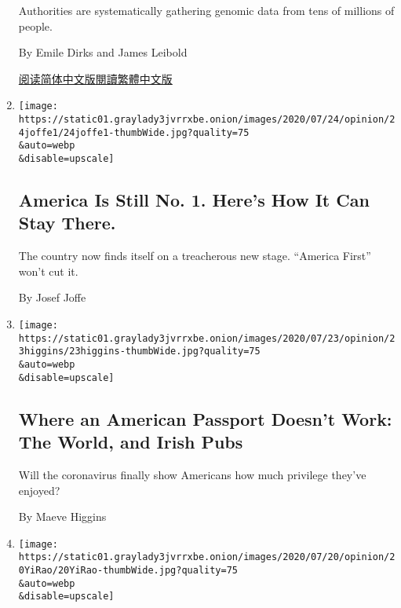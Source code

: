 \begin{enumerate}
  Authorities are systematically gathering genomic data from tens of
  millions of people.

  By Emile Dirks and James Leibold

  \href{https://cn.nytimes3xbfgragh.onion/opinion/20200728/china-dna-police/}{阅读简体中文版}\href{https://cn.nytimes3xbfgragh.onion/opinion/20200728/china-dna-police/zh-hant/}{閱讀繁體中文版}
\item
  \href{/2020/07/24/opinion/united-states-europe-china.html}{}

  \texttt{[image: https://static01.graylady3jvrrxbe.onion/images/2020/07/24/opinion/24joffe1/24joffe1-thumbWide.jpg?quality=75\\\&auto=webp\\\&disable=upscale]}

  \hypertarget{america-is-still-no-1-heres-how-it-can-stay-there}{%
  \subsection{America Is Still No. 1. Here's How It Can Stay
  There.}\label{america-is-still-no-1-heres-how-it-can-stay-there}}

  The country now finds itself on a treacherous new stage. ``America
  First'' won't cut it.

  By Josef Joffe
\item
  \href{/2020/07/23/opinion/passport-coronavirus-travel.html}{}

  \texttt{[image: https://static01.graylady3jvrrxbe.onion/images/2020/07/23/opinion/23higgins/23higgins-thumbWide.jpg?quality=75\\\&auto=webp\\\&disable=upscale]}

  \hypertarget{where-an-american-passport-doesnt-work-the-world-and-irish-pubs}{%
  \subsection{Where an American Passport Doesn't Work: The World, and
  Irish
  Pubs}\label{where-an-american-passport-doesnt-work-the-world-and-irish-pubs}}

  Will the coronavirus finally show Americans how much privilege they've
  enjoyed?

  By Maeve Higgins
\item
  \href{/2020/07/22/opinion/coronavirus-china-us.html}{}

  \texttt{[image: https://static01.graylady3jvrrxbe.onion/images/2020/07/20/opinion/20YiRao/20YiRao-thumbWide.jpg?quality=75\\\&auto=webp\\\&disable=upscale]}

  \hypertarget{my-relatives-in-wuhan-survived-my-uncle-in-new-york-did-not}{%
}
\end{enumerate}
